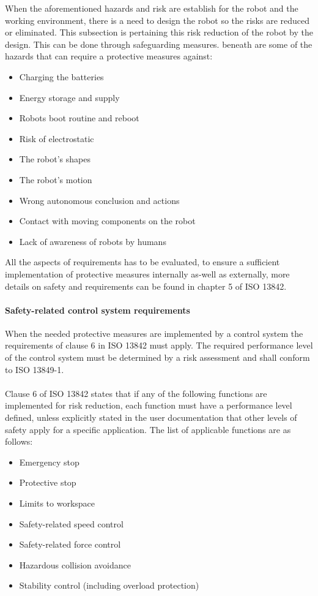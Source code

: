 When the aforementioned hazards and risk are establish for the robot and the working environment, there is a need to design the robot so the risks are reduced or eliminated. This subsection is pertaining this risk reduction of the robot by the design. This can be done through safeguarding measures. beneath are some of the hazards that can require a protective measures against:
\begin{itemize}
    \item Charging the batteries
    \item Energy storage and supply
    \item Robots boot routine and reboot
    \item Risk of electrostatic
    \item The robot's shapes
    \item The robot's motion
    \item Wrong autonomous conclusion and actions
    \item Contact with moving components on the robot
    \item Lack of awareness of robots by humans
\end{itemize}

All the aspects of requirements has to be evaluated, to ensure a sufficient implementation of protective measures internally as-well as externally, more details on safety and requirements can be found in chapter 5 of ISO 13842.\cite{ISO13842}\\



\paragraph{Safety-related control system requirements}\label{secsub:SafetyRelated}
When the needed protective measures are implemented by a control system the requirements of clause 6 in ISO 13842 must apply. The required performance level of the control system must be determined by a risk assessment and shall conform to ISO 13849-1.\\
\\
Clause 6 of ISO 13842 states that if any of the following functions are implemented for risk reduction, each function must have a performance level defined, unless explicitly stated in the user documentation that other levels of safety apply for a specific application.
The list of applicable functions are as follows:
\begin{itemize}
    \item Emergency stop
    \item Protective stop
    \item Limits to workspace
    \item Safety-related speed control
    \item Safety-related force control
    \item Hazardous collision avoidance
    \item Stability control (including overload protection)
\end{itemize}

